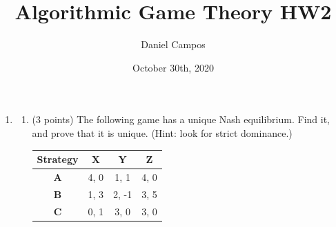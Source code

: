 \documentclass[11pt]{article}
\title{Algorithmic Game Theory HW2}
\author{Daniel Campos}
\date{October 30th, 2020}
\begin{document}
\maketitle
\begin{enumerate}
\section{Problem 1}
\item 
\begin{enumerate}
    \item (3 points) The following game has a unique Nash equilibrium. Find
it, and prove that it is unique. (Hint: look for strict dominance.)
\begin{center}
\begin{tabular}{| c | c | c | c|}
\hline
\textbf{Strategy} & \textbf{X} & \textbf{Y} & \textbf{Z} \\ \hline \hline
\textbf{A} & 4, 0 & 1, 1 & 4, 0 \\ \hline
\textbf{B} & 1, 3 & 2, -1 & 3, 5 \\ \hline
\textbf{C} & 0, 1 & 3, 0 & 3, 0 \\
\hline
\end{tabular}
\end{center}

\end{enumerate}
\end{enumerate}
\end{document}
